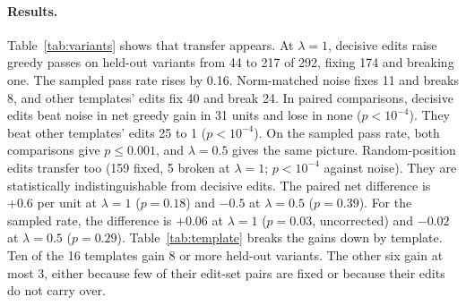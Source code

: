 \documentclass[11pt]{article}
\begin{document}
\begin{table}[t]
\centering
\small

\caption{Transfer to unseen variants of the same template (16 templates, three splits). The fixing edits of five variants per template are summed, scaled and applied, and the template's held-out variants are decoded. ``Greedy pass'' and ``Fixed / broke'' count held-out variants. $\Delta$ sample rate is the mean change in the pass rate of four samples per variant. Random-position edits have more units because their episodes fix more pairs.}
\label{tab:variants}
\end{table}

\paragraph{Results.}
Table~\ref{tab:variants} shows that transfer appears. At $\lambda{=}1$, decisive edits raise greedy passes on held-out variants from 44 to 217 of 292, fixing 174 and breaking one. The sampled pass rate rises by 0.16. Norm-matched noise fixes 11 and breaks 8, and other templates' edits fix 40 and break 24. In paired comparisons, decisive edits beat noise in net greedy gain in 31 units and lose in none ($p<10^{-4}$). They beat other templates' edits 25 to 1 ($p<10^{-4}$). On the sampled pass rate, both comparisons give $p\le 0.001$, and $\lambda{=}0.5$ gives the same picture. Random-position edits transfer too (159 fixed, 5 broken at $\lambda{=}1$; $p<10^{-4}$ against noise). They are statistically indistinguishable from decisive edits. The paired net difference is $+0.6$ per unit at $\lambda{=}1$ ($p{=}0.18$) and $-0.5$ at $\lambda{=}0.5$ ($p{=}0.39$). For the sampled rate, the difference is $+0.06$ at $\lambda{=}1$ ($p{=}0.03$, uncorrected) and $-0.02$ at $\lambda{=}0.5$ ($p{=}0.29$). Table~\ref{tab:template} breaks the gains down by template. Ten of the 16 templates gain 8 or more held-out variants. The other six gain at most 3, either because few of their edit-set pairs are fixed or because their edits do not carry over.

\begin{table}[t]
\centering
\small

\caption{Net greedy gain (fixed minus broke) on held-out variants per template at $\lambda{=}1$, summed over three splits.}
\label{tab:template}
\end{table}
\end{document}
